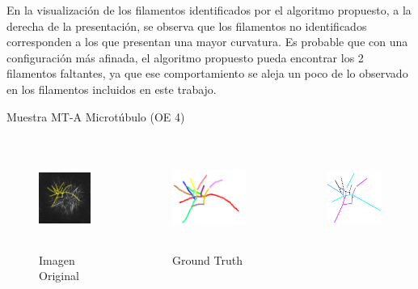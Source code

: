 { \item En la visualizaci\'on de los filamentos identificados por el algoritmo propuesto, a la derecha de la presentaci\'on, se observa que los filamentos no identificados corresponden a los que presentan una mayor curvatura.
 Es probable que con una configuraci\'on m\'as afinada, el algoritmo propuesto pueda encontrar los 2 filamentos faltantes, ya que ese comportamiento se aleja un poco de lo observado en los filamentos incluidos en este trabajo.
}

\begin{frame}{Muestra MT-A Microt\'ubulo (OE 4)}
\vspace{-1cm}
    \begin{columns}
        \begin{column}{0.22\textwidth}
            \begin{figure}
                \centering
                \includegraphics[height=1.3in]{Pictures/SPINNING-DISK-MARCHANTIA-rois-unlabeled.png}
                \caption{Imagen Original}
            \end{figure}
        \end{column}
        \begin{column}{0.22\textwidth}
            \begin{figure}
                \centering
                \includegraphics[height=1.3in]{Pictures/50-ROIs-Spinning-Marchantia-solved-rot-unlabeled.png}
                \caption{Ground Truth}
            \end{figure}
        \end{column}
        \begin{column}{0.22\textwidth}
            \begin{figure}
                \centering
                \includegraphics[height=1.3in]{Pictures/50-ROIs-Spinning-Marchantia-DeFiNeExactMatch-30.png}

\end{figure}
\end{column}
\end{columns}
\end{frame}
